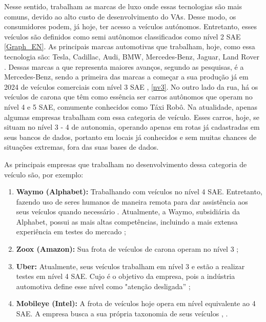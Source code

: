 Nesse sentido, trabalham as marcas de luxo onde essas tecnologias são mais comuns, devido ao alto custo de desenvolvimento do VAs. Desse modo, os consumidores podem, já hoje, ter acesso a veículos autónomos. Entretanto, esses veículos são definidos como semi autônomos classificados como nível 2 SAE \ref{Graph_EN}. As principais marcas automotivas que trabalham, hoje, como essa tecnologia são:  Tesla, Cadillac, Audi, BMW, Mercedes-Benz, Jaguar, Land Rover \cite{caio}. 
Dessas marcas a que representa maiores avanços, segundo as pesquisas, é a Mercedes-Benz, sendo a primeira das marcas a começar a sua produção já em 2024 de veículos comerciais com nível 3 SAE \cite{mercedes3}, \ref{nv3}.
No outro lado da rua, há os veículos de carona que têm como essência ser carros autônomos que operam no nível 4 e 5 SAE, comumente conhecidos como Táxi Robô. Na atualidade, apenas algumas empresas trabalham com essa categoria de veículo. Esses carros, hoje, se situam no nível 3 - 4 de autonomia, operando apenas em rotas já cadastradas em seus bancos de dados, portanto em locais já conhecidos e sem muitas chances de situações extremas, fora das suas bases de dados. 

As principais empresas que trabalham no desenvolvimento dessa categoria de veículo são, por exemplo:

\begin{enumerate}

   \item \textbf{Waymo (Alphabet):}
         Trabalhando com veículos no nível 4 SAE. Entretanto, fazendo uso de seres humanos de maneira remota para dar assistência aos seus veículos quando necessário \cite{waymo}. Atualmente, a Waymo, subsidiária da Alphabet, possui as mais altas competências, incluindo a mais extensa experiência em testes do mercado \cite{CAM};
   \item \textbf{Zoox (Amazon):}
         Sua frota de veículos de carona operam no nível 3 \cite{zoox};
   \item \textbf{Uber:}
         Atualmente, seus veículos trabalham em nível 3 e estão a realizar testes em nível 4 SAE. Cujo é o objetivo da empresa, pois a indústria automotiva define esse nível como "atenção desligada” \cite{uber};
   \item \textbf{Mobileye (Intel):}
         A frota de veículos hoje opera em nível equivalente ao 4 SAE. A empresa busca a sua própria taxonomia de seus veículos \cite{mobileye}, \cite{mobileye1}.
\end{enumerate}

